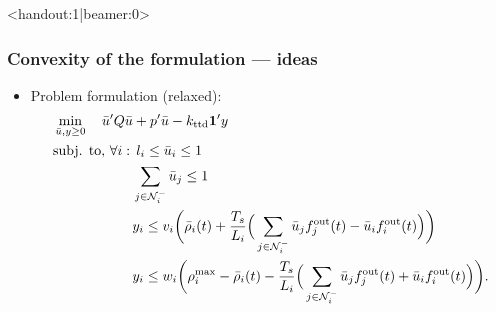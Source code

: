 \begin{frame}<handout:1|beamer:0>
\frametitle{Convexity of the formulation --- ideas}
    \begin{itemize}
    \item Problem formulation (relaxed):
    \[
    \begin{aligned}
    & \min_{\bar{u}, y\geq0}\quad  \bar{u}' Q \bar{u} + p' \bar{u} - k_{\text{ttd}}\mathbf{1}'y \\
    & \text{subj. to, }\forall i:\,  l_i\leq\bar{u}_i\leq1\,\\
    & \phantom{\text{subj. to, }\forall i:\,} \sum_{j\in\neighUp_i}\bar{u}_j \leq 1\\
    & \phantom{\text{subj. to, }\forall i:\,} y_i \leq v_i \bigg( \bar{\rho}_i(t) + \frac{T_s}{L_i}\Big(\sum_{j\in\neighUp_i} \bar{u}_j f^\text{out}_j(t) - \bar{u}_i f^\text{out}_i(t) \Big)\bigg)\\
    & \phantom{\text{subj. to, }\forall i:\,} y_i \leq w_i \bigg( \rho^\text{max}_i - \bar{\rho}_i(t) - \frac{T_s}{L_i}\Big(\sum_{j\in\neighUp_i} \bar{u}_j f^\text{out}_j(t) + \bar{u}_i f^\text{out}_i(t) \Big)\bigg).
    \end{aligned}
    \]
    \end{itemize}
\end{frame}